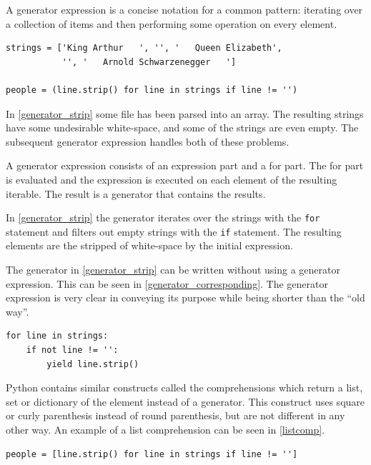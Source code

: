 A generator expression is a concise notation for a common pattern: iterating over a collection of items and then performing some operation on every element\citep{python_functional}.

\begin{lstlisting}[style=python, caption={Generator expression, stripping white-space from strings}, label={generator_strip}]
strings = ['King Arthur   ', '', '   Queen Elizabeth',
           '', '   Arnold Schwarzenegger   ']

people = (line.strip() for line in strings if line != '')
\end{lstlisting}

In \cref{generator_strip} some file has been parsed into an array.
The resulting strings have some undesirable white-space, and some of the strings are even empty.
The subsequent generator expression handles both of these problems.

A generator expression consists of an expression part and a for part.
The for part is evaluated and the expression is executed on each element of the resulting iterable.
The result is a generator that contains the results.

In \cref{generator_strip} the generator iterates over the strings with the \texttt{for} statement and filters out empty strings with the \texttt{if} statement.
The resulting elements are the stripped of white-space by the initial expression.

The generator in \cref{generator_strip} can be written without using a generator expression.
This can be seen in \cref{generator_corresponding}.
The generator expression is very clear in conveying its purpose while being shorter than the ``old way''.
\begin{lstlisting}[style=python, caption={\Cref{generator_strip} implemented without using an generator expression}, label={generator_corresponding}]
for line in strings:
    if not line != '':
        yield line.strip()
\end{lstlisting}

Python contains similar constructs called the comprehensions which return a list, set or dictionary of the element instead of a generator.
This construct uses square or curly parenthesis instead of round parenthesis, but are not different in any other way.
An example of a list comprehension can be seen in \cref{listcomp}.

\begin{lstlisting}[style=python, caption={The generator from \cref{generator_strip} changed to a list comprehension}, label={listcomp}]
people = [line.strip() for line in strings if line != '']
\end{lstlisting}

